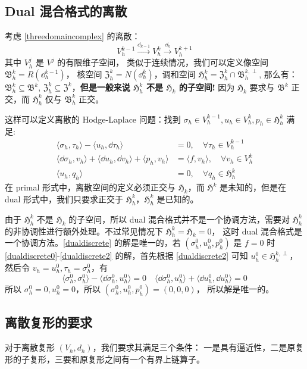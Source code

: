 \documentclass[lang=cn,a4paper,newtx]{elegantpaper}
\begin{document}
\subsection{Dual 混合格式的离散}
考虑 \eqref{threedomaincomplex} 的离散：
$$
V^{k-1}_h \xrightarrow{\dd_{k-1}} V^k_h \xrightarrow{\dd_k} V^{k+1}_h
$$
其中 $V_h^j$ 是 $V^j$ 的有限维子空间，
类似于连续情况，我们可以定义像空间 $\mathfrak{B}^k_h = R(\dd^{k-1}_h)$，
核空间 $\mathfrak{Z}^k_h = N(\dd^k_h)$，调和空间 $\mathfrak{H}^k_h =
\mathfrak{Z}^k_h\cap \mathfrak{B}_h^{k, \perp}$, 
那么有：$\mathfrak{B}^k_h \subseteq \mathfrak{B}^k$, 
$\mathfrak{Z}^k_h \subseteq \mathfrak{Z}^k$，\textbf{但是一般来说
$\mathfrak{H}^k_h$ 不是 $\mathfrak{H}_k$ 的子空间!} 因为 $\mathfrak{H}_k$
要求与 $\mathfrak{B}^k$ 正交，而 $\mathfrak{H}^k_h$ 仅与 $\mathfrak{B}^k_h$
正交。

这样可以定义离散的 Hodge-Laplace 问题：找到 $\sigma_h \in V^{k-1}_h, u_h \in
V^k_h, p_h \in \mathfrak{H}^k_h$ 满足:
\begin{align}
\label{dualdiscrete0}
\langle \sigma_h, \tau_h\rangle - \langle u_h, \dd \tau_h\rangle & = 0, \quad \forall \tau_h \in V^{k-1}_h\\
\label{dualdiscrete1}
\langle \dd \sigma_h, v_h\rangle + \langle \dd u_h, \dd v_h\rangle + \langle p_h, v_h\rangle & = \langle f, v_h\rangle, \quad \forall v_h \in V^k_h\\
\label{dualdiscrete2}
\langle u_h, q_h\rangle & = 0, \quad \forall q_h \in \mathfrak{H}^k_h
\end{align}
在 primal 形式中，离散空间的定义必须正交与 $\mathfrak{H}_k$，而
$\mathfrak{H}^k$ 是未知的，但是在 dual 形式中，我们只要求正交于
$\mathfrak{H}_h^k$，$\mathfrak{H}^k_h$ 是已知的。

由于 $\mathfrak{H}^k_h$ 不是 $\mathfrak{H}_k$ 的子空间，所以 dual
混合格式并不是一个协调方法，需要对 $\mathfrak{H}^k_h$
的非协调性进行额外处理。不过常见情况下 $\mathfrak{H}^k_h = \mathfrak{H}_k = 0$，
这时 dual 混合格式是一个协调方法。\eqref{dualdiscrete} 的解是唯一的，若
$(\sigma_h^0, u_h^0, p_h^0)$ 是 $f = 0$ 时 \eqref{dualdiscrete0}-\eqref{dualdiscrete2}
的解，首先根据 \eqref{dualdiscrete2} 可知 $u_h^0 \in \mathfrak{H}_h^{k, \perp}$，
然后令 $v_h = u_h^0, \tau_h = \sigma_h^0$，有
$$
\langle \sigma_h^0, \sigma_h^0\rangle - \langle \dd \sigma_h^0, u_h^0\rangle = 0
\quad 
\langle \dd \sigma_h^0, u_h^0\rangle + \langle \dd u_h^0, \dd u_h^0\rangle = 0
$$
所以 $\sigma_h^0 = 0, u_h^0 = 0$，所以 $(\sigma_h^0, u_h^0, p_h^0) = (0, 0, 0)$，
所以解是唯一的。

\subsection{离散复形的要求}
对于离散复形 $(V_h, d_h)$，我们要求其满足三个条件：
一是具有逼近性，二是原复形的子复形，三要和原复形之间有一个有界上链算子。
\end{document}
